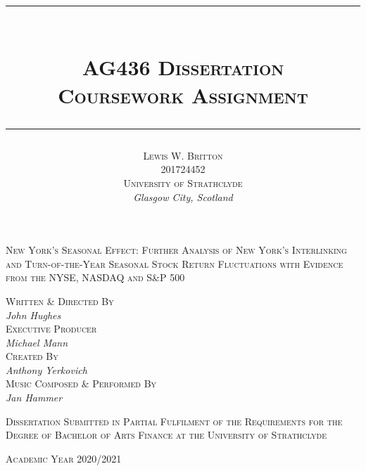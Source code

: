 \documentclass[11pt, english]{article}
\newcommand{\HRule}[1]{\rule{\linewidth}{#1}}
\begin{document}


	\title{
                \HRule{0.5pt}\\ [0.3cm]
                \huge\textsc{AG436 Dissertation}\\
                \Large\textsc{Coursework Assignment}\\ [0.25cm]
                \HRule{0.5pt}
                }
	\author{\textsc{Lewis W. Britton}\\
                \textsc{201724452}\\
                \textsc{University of Strathclyde}\\
		\textit{Glasgow City, Scotland}
                }
	\date{}
	\maketitle

        \begin{center}
                \textsc{New York's Seasonal Effect: Further Analysis of New York's Interlinking and Turn-of-the-Year Seasonal Stock Return Fluctuations with Evidence from the NYSE, NASDAQ and S\&P 500}
        \end{center}

        \vspace{\fill}

	\begin{center}
		\textsc{Written \& Directed By}\\ \textit{John Hughes}\\
		\textsc{Executive Producer}\\ \textit{Michael Mann}\\
		\textsc{Created By}\\ \textit{Anthony Yerkovich}\\
		\textsc{Music Composed \& Performed By}\\ \textit{Jan Hammer}
	\end{center}

	\begin{center}
	\end{center}

	\begin{center}
        	\textsc{Dissertation Submitted in Partial Fulfilment of the Requirements for the Degree of Bachelor of Arts Finance at the University of Strathclyde}
	\end{center}

	\begin{center}
		\textsc{Academic Year 2020/2021}
	\end{center}
\end{document}
